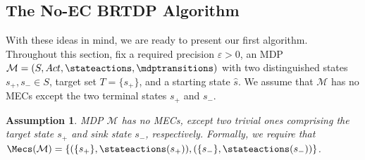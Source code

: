 \documentclass{theoretics}
\newcommand{\MDP}{\mathcal{M}}
\newcommand{\States}{S}
\newcommand{\initialstate}{\hat{s}}
\newcommand{\Actions}{Act}
\newcommand{\finitepath}{\varrho}
\DeclareMathOperator{\val}{\mathcal{V}}
\newcommand{\upperbound}{\mathsf{Up}}
\newcommand{\lowerbound}{\mathsf{Lo}}
\newcommand{\targetstate}{s_+}
\newcommand{\sinkstate}{s_-}
\newcommand{\targetset}{T}
\newcommand{\samplepath}{\textsc{SamplePairs}}
\newcommand{\algoepisode}{\mathsf{e}}
\newtheorem{assumption}{Assumption}
\begin{document}
\subsection{The No-EC BRTDP Algorithm} \label{sec:brtdp_no_ec:algo}

With these ideas in mind, we are ready to present our first algorithm.
Throughout this section, fix a required precision $\varepsilon > 0$, an MDP $\MDP = (\States, \Actions, \stateactions, \mdptransitions)$ with two distinguished states $\targetstate, \sinkstate \in \States$, target set $\targetset = \{\targetstate\}$, and a starting state $\initialstate$.
We assume that $\MDP$ has no MECs except the two terminal states $\targetstate$ and $\sinkstate$.
\begin{assumption} \label{asm:mec_free}
	MDP $\MDP$ has no MECs, except two trivial ones comprising the target state $\targetstate$ and sink state $\sinkstate$, respectively.
	Formally, we require that $\Mecs(\MDP) = \{(\{\targetstate\}, \stateactions(\targetstate)), (\{\sinkstate\}, \stateactions(\sinkstate))\}$.
\end{assumption}
\end{document}
